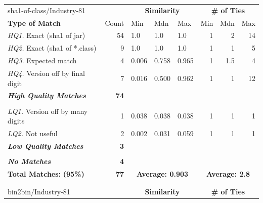 \begin{table}[h]
    \centering
    \begin{tabular}[htbp]{l|r|lll|rrr}
        sha1-of-class/Industry-81  &              & \multicolumn{3}{c|}{\textbf{Similarity}}  & \multicolumn{3}{c}{\textbf{\# of Ties}} \\
        \textbf{Type of Match}     & Count        & Min   & Mdn    & Max   & Min  & Mdn  & Max  \\
        \hline
        \emph{HQ1.} Exact (sha1 of jar)        & 54           & 1.0   & 1.0    & 1.0   & 1    & 2    & 14   \\
        \emph{HQ2.} Exact (sha1 of *.class)    &  9           & 1.0   & 1.0    & 1.0   & 1    & 1    &  5   \\
        \emph{HQ3.} Expected match             &  4           & 0.006 & 0.758  & 0.965 & 1    & 1.5  &  4   \\
        \emph{HQ4.} Version off by final digit &  7           & 0.016 & 0.500  & 0.962 & 1    & 1    & 12   \\
        \emph{\textbf{High Quality Matches}}   & \textbf{74}  &       &        &       &      &      &      \\
        & & & & & & & \\
        \emph{LQ1.} Version off by many digits &  1           & 0.038 & 0.038  & 0.038 & 1    & 1    &  1   \\
        \emph{LQ2.} Not useful                 &  2           & 0.002 & 0.031  & 0.059 & 1    & 1    &  1   \\
        \emph{\textbf{Low Quality Matches}}    & \textbf{3}   &       &        &       &      &      &      \\
        & & & & & & & \\
        \emph{\textbf{No Matches}}             & \textbf{4}   &       &        &       &      &      &      \\
        \hline
        \textbf{Total Matches:} \hspace{3em}   \textbf{(95\%)} &  \textbf{77}   & \multicolumn{3}{c|}{\textbf{Average: 0.903}}  & \multicolumn{3}{c}{\textbf{Average: 2.8}} \\
        \multicolumn{8}{c}{} \\
        \multicolumn{8}{c}{} \\
        bin2bin/Industry-81        &              & \multicolumn{3}{c|}{\textbf{Similarity}}  & \multicolumn{3}{c}{\textbf{\# of Ties}} \\

\end{tabular}
\end{table}
